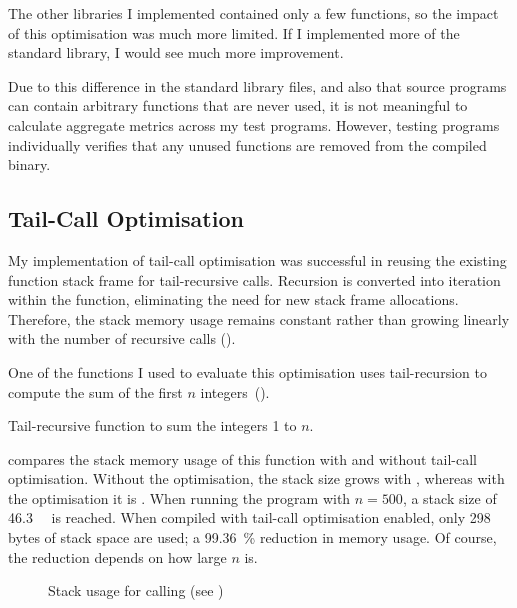 \documentclass[00-main.tex]{subfiles}
\begin{document}
The other libraries I implemented contained only a few functions, so the impact of this optimisation was much more limited.
If I implemented more of the standard library, I would see much more improvement.

Due to this difference in the standard library files, and also that source programs can contain arbitrary functions that are never used, it is not meaningful to calculate aggregate metrics across my test programs.
However, testing programs individually verifies that any unused functions are removed from the compiled binary.

\subsection{Tail-Call Optimisation}\label{sec:eval:tail-call optimisation}

My implementation of tail-call optimisation was successful in reusing the existing function stack frame for tail-recursive calls.
Recursion is converted into iteration within the function, eliminating the need for new stack frame allocations.
Therefore, the stack memory usage remains constant rather than growing linearly with the number of recursive calls ().

One of the functions I used to evaluate this optimisation uses tail-recursion to compute the sum of the first $n$ integers~().

\begin{listing}[t]
  \caption{Tail-recursive function to sum the integers 1 to $n$.\medskip}
  \label{lst:tail-recursive sum}
\end{listing}


 compares the stack memory usage of this function with and without tail-call optimisation.
Without the optimisation, the stack size grows with , whereas with the optimisation it is .
When running the program with $n=500$, a stack size of \SI{46.3}{\kilo\byte} is reached.
When compiled with tail-call optimisation enabled, only 298 bytes of stack space are used; a \SI{99.36}{\percent} reduction in memory usage.
Of course, the reduction depends on how large $n$ is.

\begin{figure}[t]
  \centering
  \caption{Stack usage for calling  (see )}
  \label{fig:tail-call optimisation stack use} %
\end{figure}
\end{document}
